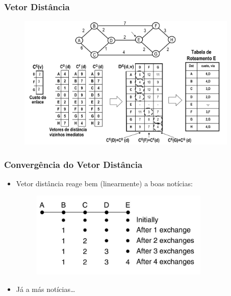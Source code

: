 \documentclass{beamer}
\begin{document}
\begin{frame}
\frametitle{Vetor Distância}
\begin{figure}[htp]
\begin{center}
  \includegraphics[width=105mm]{Imagens/VetorDistancia.png}
  \label{vetor_distancia}
\end{center}
\end{figure}
\end{frame}

\begin{frame}
\frametitle{Convergência do Vetor Distância}

\begin{itemize}
  \item Vetor distância reage bem (linearmente) a boas notícias:
\begin{figure}[htp]
\begin{center}
  \includegraphics[width=85mm]{Imagens/ConvergenciaVetorDistancia.jpeg}
  \label{convergencia_vetor_distancia}
\end{center}
\end{figure}
   \item Já a más notícias\ldots
\end{itemize}
\end{frame}
\end{document}

